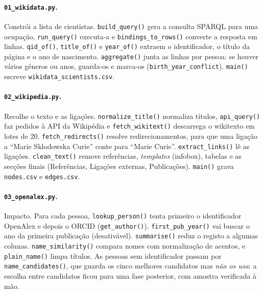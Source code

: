 \documentclass[11pt,a4paper]{article}
\newcommand{\file}[1]{\texttt{#1}}
\newcommand{\fn}[1]{\texttt{#1()}}
\begin{document}
\paragraph{\file{01_wikidata.py}.} Constrói a lista de cientistas. \fn{build_query} gera a consulta SPARQL para uma ocupação, \fn{run_query} executa-a e \fn{bindings_to_rows} converte a resposta em linhas. \fn{qid_of}, \fn{title_of} e \fn{year_of} extraem o identificador, o título da página e o ano de nascimento. \fn{aggregate} junta as linhas por pessoa: se houver vários géneros ou anos, guarda-os e marca-os (\texttt{birth\_year\_conflict}). \fn{main} escreve \file{wikidata_scientists.csv}.

\paragraph{\file{02_wikipedia.py}.} Recolhe o texto e as ligações. \fn{normalize_title} normaliza títulos, \fn{api_query} faz pedidos à API da Wikipédia e \fn{fetch_wikitext} descarrega o wikitexto em lotes de 20. \fn{fetch_redirects} resolve redirecionamentos, para que uma ligação a ``Marie Sklodowska Curie'' conte para ``Marie Curie''. \fn{extract_links} lê as ligações. \fn{clean_text} remove referências, \emph{templates} (infobox), tabelas e as secções finais (Referências, Ligações externas, Publicações). \fn{main} grava \file{nodes.csv} e \file{edges.csv}.

\paragraph{\file{03_openalex.py}.} Impacto. Para cada pessoa, \fn{lookup_person} tenta primeiro o identificador OpenAlex e depois o ORCID (\fn{get_author}). \fn{first_pub_year} vai buscar o ano da primeira publicação (desativável). \fn{summarise} reduz o registo a algumas colunas. \fn{name_similarity} compara nomes com normalização de acentos, e \fn{plain_name} limpa títulos. As pessoas sem identificador passam por \fn{name_candidates}, que guarda os cinco melhores candidatos mas \emph{não os usa}: a escolha entre candidatos ficou para uma fase posterior, com amostra verificada à mão.
\end{document}
